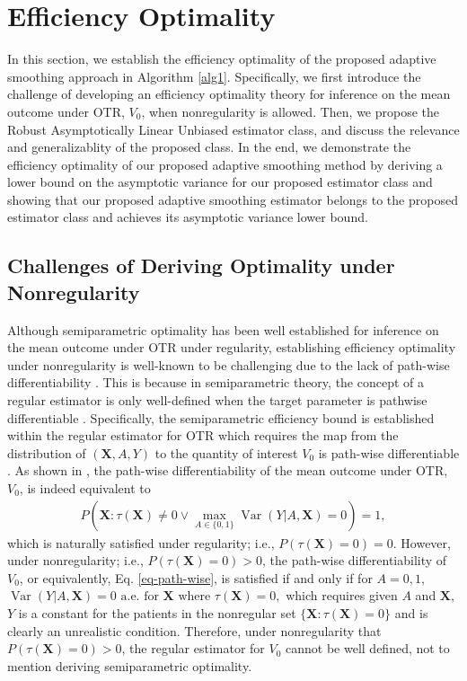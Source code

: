 \documentclass[11pt]{article}
\theoremstyle{referenceplain}
\theoremstyle{referencedefinition}
\theoremstyle{referenceremark}
\begin{document}


\section{Efficiency Optimality}
In this section, we establish the efficiency optimality of the proposed adaptive smoothing approach in Algorithm \ref{alg1}. Specifically, we first introduce the challenge of developing an efficiency optimality theory for inference on the mean outcome under OTR, \(V_0\), when nonregularity is allowed. Then, we propose the Robust Asymptotically Linear Unbiased estimator class, and discuss the relevance and generalizablity of the proposed class. In the end, we demonstrate the efficiency optimality of our proposed adaptive smoothing method by deriving a lower bound on the asymptotic variance for our proposed estimator class and showing that our proposed adaptive smoothing estimator belongs to the proposed estimator class and achieves its asymptotic variance lower bound.

\subsection{Challenges of Deriving Optimality under Nonregularity}
Although semiparametric optimality has been well established for inference on the mean outcome under OTR under regularity, establishing efficiency optimality under nonregularity is well-known to be challenging due to the lack of path-wise differentiability \citep{van2011targeted,luedtke2016statistical}. This is because in semiparametric theory, the concept of a regular estimator is only well-defined when the target parameter is pathwise differentiable \citep{bickel1993efficient,van2000asymptotic}. Specifically, the semiparametric efficiency bound is established within the regular estimator for OTR which requires the map from the distribution of $(\mathbf{X},A, Y)$ to the quantity of interest $V_0$ is path-wise differentiable \citep{kennedy2017semiparametric,bickel1993efficient}. As shown in \citet{luedtke2016statistical}, the path-wise differentiability of the mean outcome under OTR, $V_0$, is indeed equivalent to
\begin{align}\label{eq-path-wise}
    P\left(\mathbf{X}: \tau(\mathbf{X})\neq 0 \lor \max_{A\in\{0,1\}}\operatorname{Var}(Y|A,\mathbf{X})=0\right)=1,
\end{align}
which is naturally satisfied under regularity; i.e., $P(\tau(\mathbf{X})=0)=0$. However, under nonregularity; i.e., $P(\tau(\mathbf{X})=0)>0$, the path-wise differentiability of $V_0$, or equivalently, Eq. \eqref{eq-path-wise}, is satisfied if and only if for $A=0,1$, 
$\operatorname{Var}(Y|A,\mathbf{X})=0\text{ a.e. for } \mathbf{X}\text{ where }\tau(\mathbf{X})=0,$ 
which requires given $A$ and $\mathbf{X}$, $Y$ is a constant for the patients in the nonregular set $\{\mathbf{X}:\tau(\mathbf{X})=0\}$ and is clearly an unrealistic condition. Therefore, under nonregularity that $P(\tau(\mathbf{X})=0)>0$, the regular estimator for $V_0$ cannot be well defined, not to mention deriving semiparametric optimality.
\end{document}
